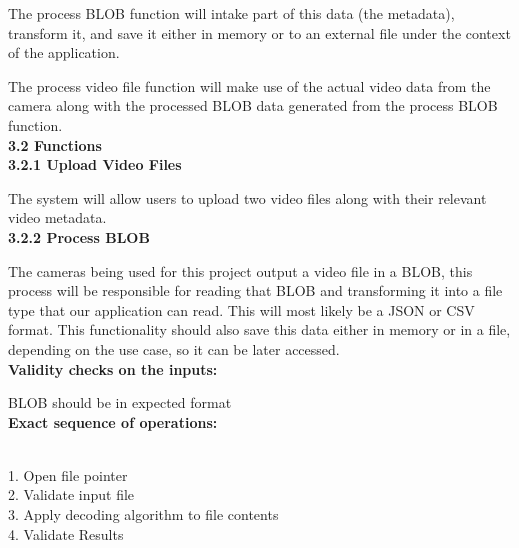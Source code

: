 \documentclass[10pt,draftclsnofoot,onecolumn]{IEEEtran}
\begin{document}
The process BLOB function will intake part of this data (the metadata), transform it, and save it either in memory or to an external file under the context of the application.\\
\vspace{2mm}


The process video file function will make use of the actual video data from the camera along with the processed BLOB data generated from the process BLOB function.\\

\vspace{5mm}
{\Medium\textbf{3.2 Functions}} \\
\vspace{5mm}
\textbf{{3.2.1 Upload Video Files}} \\
\vspace{5mm}

 
 The system will allow users to upload two video files along with their relevant video metadata.\\
 \vspace{5mm}
\textbf{{3.2.2 Process BLOB}} \\
\vspace{5mm}

 
 The cameras being used for this project output a video file in a BLOB, this process will be responsible for reading that BLOB and transforming it into a file type that our application can read. This will most likely be a JSON or CSV format. This functionality should also save this data either in memory or in a file, depending on the use case, so it can be later accessed.\\
 \vspace{5mm}
 \textbf{Validity checks on the inputs:}\\
  \vspace{5mm}

  BLOB should be in expected format
\\
 \vspace{5mm}
\textbf{Exact sequence of operations: }\\\\
 \vspace{5mm}

1. Open file pointer\\
2. Validate input file\\
3. Apply decoding algorithm to file contents\\
4. Validate Results\\

 \vspace{5mm}
\end{document}
